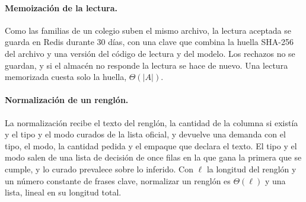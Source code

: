 \iffalse %
\paragraph{Memoización de la lectura.}
Como las familias de un colegio suben el mismo archivo, la lectura aceptada se guarda en Redis
durante 30 días, con una clave que combina la huella SHA-256 del archivo y una versión del código de
lectura y del modelo. Los rechazos no se guardan, y si el almacén no responde la lectura se hace de
nuevo. Una lectura memorizada cuesta solo la huella, $\Theta(\lvert A\rvert)$.

\begin{algorithm}[H]
\caption{Memoización de la lectura de un archivo.}
\label{alg:anexo-memo}
\small
{}
\end{algorithm}

\paragraph{Normalización de un renglón.}
La normalización recibe el texto del renglón, la cantidad de la columna si existía y el tipo y el
modo curados de la lista oficial, y devuelve una demanda con el tipo, el modo, la cantidad pedida y
el empaque que declara el texto. El tipo y el modo salen de una lista de decisión de once filas en la
que gana la primera que se cumple, y lo curado prevalece sobre lo inferido. Con $\ell$ la longitud
del renglón y un número constante de frases clave, normalizar un renglón es $\Theta(\ell)$ y una
lista, lineal en su longitud total.

